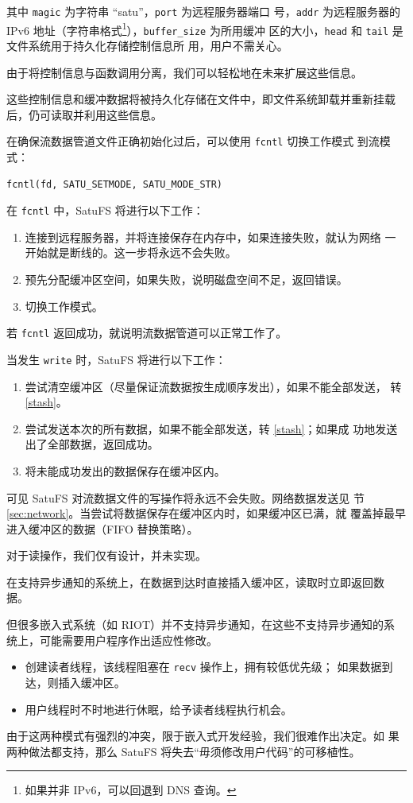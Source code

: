 \documentclass{ctexart}
\begin{document}
其中 \verb|magic| 为字符串 ``satu''，\verb|port| 为远程服务器端口
号，\verb|addr| 为远程服务器的 IPv6 地址（字符串格式\footnote{\kaishu
  如果并非 IPv6，可以回退到 DNS 查询。}），\verb|buffer_size| 为所用缓冲
区的大小，\verb|head| 和 \verb|tail| 是文件系统用于持久化存储控制信息所
用，用户不需关心。

由于将控制信息与函数调用分离，我们可以轻松地在未来扩展这些信息。

这些控制信息和缓冲数据将被持久化存储在文件中，即文件系统卸载并重新挂载
后，仍可读取并利用这些信息。

在确保流数据管道文件正确初始化过后，可以使用 \verb|fcntl| 切换工作模式
到流模式：

\begin{verbatim}
fcntl(fd, SATU_SETMODE, SATU_MODE_STR)
\end{verbatim}

在 \verb|fcntl| 中，SatuFS 将进行以下工作：

\begin{enumerate}
\item 连接到远程服务器，并将连接保存在内存中，如果连接失败，就认为网络
  一开始就是断线的。这一步将永远不会失败。
\item 预先分配缓冲区空间，如果失败，说明磁盘空间不足，返回错误。
\item 切换工作模式。
\end{enumerate}

若 \verb|fcntl| 返回成功，就说明流数据管道可以正常工作了。

当发生 \verb|write| 时，SatuFS 将进行以下工作：

\begin{enumerate}
\item 尝试清空缓冲区（尽量保证流数据按生成顺序发出），如果不能全部发送，
  转 \ref{stash}。
\item 尝试发送本次的所有数据，如果不能全部发送，转 \ref{stash}；如果成
  功地发送出了全部数据，返回成功。
\item \label{stash} 将未能成功发出的数据保存在缓冲区内。
\end{enumerate}

可见 SatuFS 对流数据文件的写操作将永远不会失败。网络数据发送见
节 \ref{sec:network}。当尝试将数据保存在缓冲区内时，如果缓冲区已满，就
覆盖掉最早进入缓冲区的数据（FIFO 替换策略）。

对于读操作，我们仅有设计，并未实现。

{
  \kaishu

  在支持异步通知的系统上，在数据到达时直接插入缓冲区，读取时立即返回数
  据。

  但很多嵌入式系统（如 RIOT）并不支持异步通知，在这些不支持异步通知的系
  统上，可能需要用户程序作出适应性修改。

  \begin{itemize}
  \item 创建读者线程，该线程阻塞在 \verb|recv| 操作上，拥有较低优先级；
    如果数据到达，则插入缓冲区。
  \item 用户线程时不时地进行休眠，给予读者线程执行机会。
  \end{itemize}

  由于这两种模式有强烈的冲突，限于嵌入式开发经验，我们很难作出决定。如
  果两种做法都支持，那么 SatuFS 将失去“毋须修改用户代码”的可移植性。
}
\end{document}
